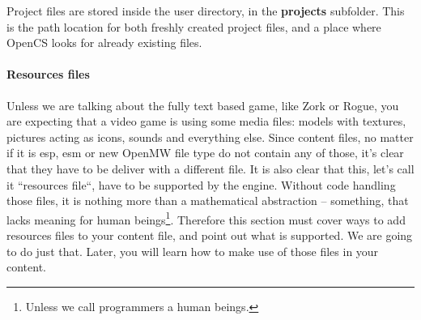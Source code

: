 Project files are stored inside the user directory, in the \textbf{projects} subfolder. This is the path location for both freshly created project files, and a place where Open{CS} looks for already existing files.\\

\paragraph{Resources files}
Unless we are talking about the fully text based game, like Zork or Rogue, you are expecting that a video game is using some media files: models with textures, pictures acting as icons, sounds and everything else. Since content files, no matter if it is esp, esm or new Open{MW} file type do not contain any of those, it's clear that they have to be deliver with a different file. It is also clear that this, let's call it ``resources file``, have to be supported by the engine. Without code handling those files, it is nothing more than a mathematical abstraction -- something, that lacks meaning for human beings\footnote{Unless we call programmers a human beings.}. Therefore this section must cover ways to add resources files to your content file, and point out what is supported. We are going to do just that. Later, you will learn how to make use of those files in your content.